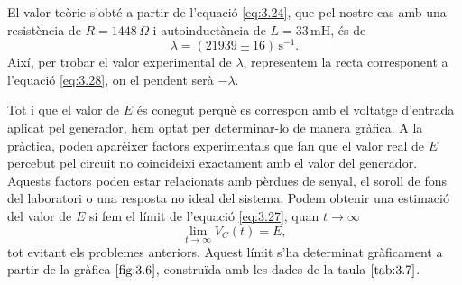 \documentclass[a4paper,10.5pt]{report}
\begin{document}
El valor teòric s'obté a partir de l'equació \eqref{eq:3.24}, que pel nostre cas amb una resistència de $R = 1448\,\Omega$ i autoinductància de $L = 33\,\text{mH}$,   és de
\begin{equation}
	\lambda = \left( 21939 \pm 16 \right) \, \text{s}^{-1}.
\end{equation}
Així, per trobar el valor experimental de $\lambda$, representem la recta corresponent a l’equació \eqref{eq:3.28}, on el pendent serà $ -\lambda$. 

Tot i que el valor de $E$ és conegut perquè es correspon amb el voltatge d’entrada aplicat pel generador, hem optat per determinar-lo de manera gràfica. A la pràctica, poden aparèixer factors experimentals que fan que el valor real de $E$ percebut pel circuit no coincideixi exactament amb el valor del generador. Aquests factors poden estar relacionats amb pèrdues de senyal, el soroll de fons del laboratori o una resposta no ideal del sistema. Podem obtenir una estimació del valor de $E$ si fem el límit de l’equació \eqref{eq:3.27}, quan $t \to \infty$
\begin{equation}
	\lim_{t \to \infty} V_C(t) = E,
\end{equation}
tot evitant els problemes anteriors. Aquest límit s’ha determinat gràficament a partir de la gràfica $\ref{fig:3.6}$, construïda amb les dades de la taula $\ref{tab:3.7}$.
\end{document}
